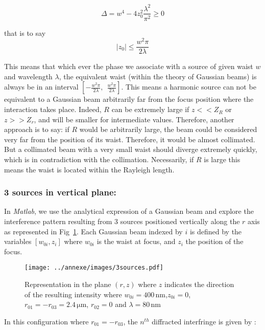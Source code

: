 \begin{equation}
\Delta = w^4 - 4z_{0}^2\frac{\lambda^2}{\pi^2} \ge 0
\end{equation}

\noindent that is to say 
$$
|z_{0}| \le \frac{w^2\pi}{2\lambda}
$$

\noindent This means that which ever the phase we associate with a source of given waist $w$ and wavelength $\lambda$, the equivalent waist (within the theory of Gaussian beams) is always be in an interval $[- \frac{w^2\pi}{2\lambda}, \ \ \frac{w^2\pi}{2\lambda}]$. This means a harmonic source can not be equivalent to a Gaussian beam arbitrarily far from the focus position where the interaction takes place. Indeed, $R$ can be extremely large if $z << Z_R$ or $z >>Z_r$, and will be smaller for intermediate values. Therefore, another approach is to say: if $R$ would be arbitrarily large, the beam could be considered very far from the position of its waist. Therefore, it would be almost collimated. But a collimated beam with a very small waist should diverge extremely quickly, which is in contradiction with the collimation. Necessarily, if $R$ is large this means the waist is located within the Rayleigh length.

\subsubsection{3 sources in vertical plane:}

In \textit{Matlab}, we use the analytical expression of a Gaussian beam\cite{CoursForget} and explore the interference pattern resulting from 3 sources positioned vertically along the $r$ axis as represented in Fig~\ref{fig:3sources}.
Each Gaussian beam indexed by $i$ is defined by the variables $[w_{0i},z_i]$ where $w_{0i}$ is the waist at focus, and $z_i$ the position of the focus.

\begin{figure}[H]
\centering
\texttt{[image: ../annexe/images/3sources.pdf]}\\
\caption{\label{fig:3sources} Representation in the plane $(r,z)$ where $z$ indicates the direction of the resulting intensity where $w_{0i} = 400\,\mathrm{nm}$,$z_{0i} =0$, $r_{01} = -r_{03} = 2.4\,\mathrm{\mu m}$, $r_{02}=0$ and $\lambda = 80\,\mathrm{nm}$}
\end{figure}

\noindent In this configuration where $r_{01} = -r_{03}$, the $n^{th}$ diffracted interfringe is given by :

